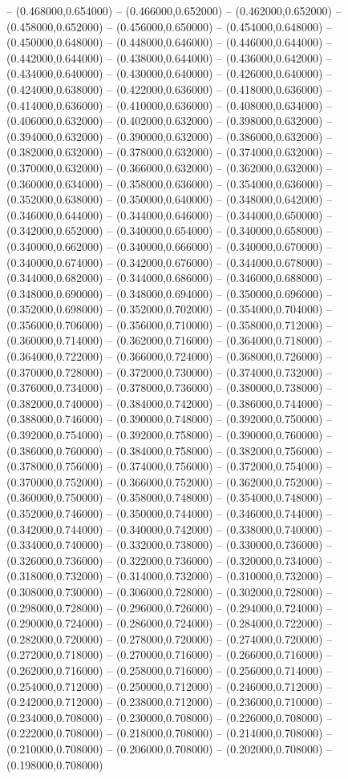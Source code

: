 -- (0.468000,0.654000) -- (0.466000,0.652000) -- (0.462000,0.652000) -- (0.458000,0.652000) -- (0.456000,0.650000) -- (0.454000,0.648000) -- (0.450000,0.648000) -- (0.448000,0.646000) -- (0.446000,0.644000) -- (0.442000,0.644000) -- (0.438000,0.644000) -- (0.436000,0.642000) -- (0.434000,0.640000) -- (0.430000,0.640000) -- (0.426000,0.640000) -- (0.424000,0.638000) -- (0.422000,0.636000) -- (0.418000,0.636000) -- (0.414000,0.636000) -- (0.410000,0.636000) -- (0.408000,0.634000) -- (0.406000,0.632000) -- (0.402000,0.632000) -- (0.398000,0.632000) -- (0.394000,0.632000) -- (0.390000,0.632000) -- (0.386000,0.632000) -- (0.382000,0.632000) -- (0.378000,0.632000) -- (0.374000,0.632000) -- (0.370000,0.632000) -- (0.366000,0.632000) -- (0.362000,0.632000) -- (0.360000,0.634000) -- (0.358000,0.636000) -- (0.354000,0.636000) -- (0.352000,0.638000) -- (0.350000,0.640000) -- (0.348000,0.642000) -- (0.346000,0.644000) -- (0.344000,0.646000) -- (0.344000,0.650000) -- (0.342000,0.652000) -- (0.340000,0.654000) -- (0.340000,0.658000) -- (0.340000,0.662000) -- (0.340000,0.666000) -- (0.340000,0.670000) -- (0.340000,0.674000) -- (0.342000,0.676000) -- (0.344000,0.678000) -- (0.344000,0.682000) -- (0.344000,0.686000) -- (0.346000,0.688000) -- (0.348000,0.690000) -- (0.348000,0.694000) -- (0.350000,0.696000) -- (0.352000,0.698000) -- (0.352000,0.702000) -- (0.354000,0.704000) -- (0.356000,0.706000) -- (0.356000,0.710000) -- (0.358000,0.712000) -- (0.360000,0.714000) -- (0.362000,0.716000) -- (0.364000,0.718000) -- (0.364000,0.722000) -- (0.366000,0.724000) -- (0.368000,0.726000) -- (0.370000,0.728000) -- (0.372000,0.730000) -- (0.374000,0.732000) -- (0.376000,0.734000) -- (0.378000,0.736000) -- (0.380000,0.738000) -- (0.382000,0.740000) -- (0.384000,0.742000) -- (0.386000,0.744000) -- (0.388000,0.746000) -- (0.390000,0.748000) -- (0.392000,0.750000) -- (0.392000,0.754000) -- (0.392000,0.758000) -- (0.390000,0.760000) -- (0.386000,0.760000) -- (0.384000,0.758000) -- (0.382000,0.756000) -- (0.378000,0.756000) -- (0.374000,0.756000) -- (0.372000,0.754000) -- (0.370000,0.752000) -- (0.366000,0.752000) -- (0.362000,0.752000) -- (0.360000,0.750000) -- (0.358000,0.748000) -- (0.354000,0.748000) -- (0.352000,0.746000) -- (0.350000,0.744000) -- (0.346000,0.744000) -- (0.342000,0.744000) -- (0.340000,0.742000) -- (0.338000,0.740000) -- (0.334000,0.740000) -- (0.332000,0.738000) -- (0.330000,0.736000) -- (0.326000,0.736000) -- (0.322000,0.736000) -- (0.320000,0.734000) -- (0.318000,0.732000) -- (0.314000,0.732000) -- (0.310000,0.732000) -- (0.308000,0.730000) -- (0.306000,0.728000) -- (0.302000,0.728000) -- (0.298000,0.728000) -- (0.296000,0.726000) -- (0.294000,0.724000) -- (0.290000,0.724000) -- (0.286000,0.724000) -- (0.284000,0.722000) -- (0.282000,0.720000) -- (0.278000,0.720000) -- (0.274000,0.720000) -- (0.272000,0.718000) -- (0.270000,0.716000) -- (0.266000,0.716000) -- (0.262000,0.716000) -- (0.258000,0.716000) -- (0.256000,0.714000) -- (0.254000,0.712000) -- (0.250000,0.712000) -- (0.246000,0.712000) -- (0.242000,0.712000) -- (0.238000,0.712000) -- (0.236000,0.710000) -- (0.234000,0.708000) -- (0.230000,0.708000) -- (0.226000,0.708000) -- (0.222000,0.708000) -- (0.218000,0.708000) -- (0.214000,0.708000) -- (0.210000,0.708000) -- (0.206000,0.708000) -- (0.202000,0.708000) -- (0.198000,0.708000) 